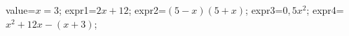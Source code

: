 \documentclass[exercice]{thedocument}%
\begin{document}
%
\>value=$x=3$;%
\>expr1=$2x+12$;%
\>expr2=$(5-x)(5+x)$;%
\>expr3=$0,5x^2$;%
\>expr4=$x^2+12x-(x+3)$;%
%
\end{document}
